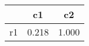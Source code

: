 \begin{table}[htbp]
\begin{tabular}{lcc} \hline \hline
 & c1  & c2  \\  \hline 
r1 &     0.218 &     1.000 \\  
\hline \hline \end{tabular}
\end{table}

